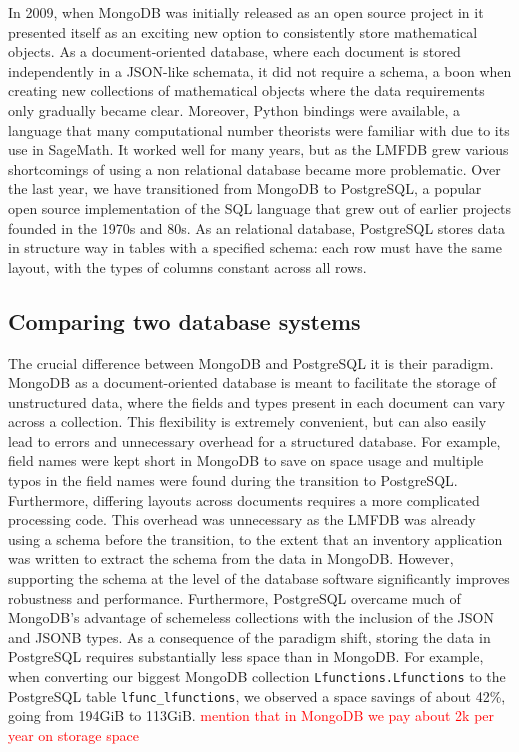 \documentclass{article}
\newcommand{\todo}[1]{\textcolor{red}{#1}}
\begin{document}
In 2009, when MongoDB was initially released as an open source project in it presented itself as an exciting new option to consistently store mathematical objects.
As a document-oriented database, where each document is stored independently in a JSON-like schemata, it did not require a schema, a boon when creating new collections of mathematical objects where the data requirements only gradually became clear.
Moreover, Python bindings were available, a language that many computational number theorists were familiar with due to its use in SageMath.
It worked well for many years, but as the LMFDB grew various shortcomings of using a non relational database became more problematic.
Over the last year, we have transitioned from MongoDB to PostgreSQL, a popular open source implementation of the SQL language that grew out of earlier projects founded in the 1970s and 80s.
As an relational database, PostgreSQL stores data in structure way in tables with a specified schema: each row must have the same layout, with the types of columns constant across all rows.

\subsection{Comparing two database systems}

The crucial difference between MongoDB and PostgreSQL it is their paradigm.
MongoDB as a document-oriented database is meant to facilitate the storage of unstructured data, where the fields and types present in each document can vary across a collection.
This flexibility is extremely convenient, but can also easily lead to errors and unnecessary overhead for a structured database.
For example, field names were kept short in MongoDB to save on space usage and multiple typos in the field names were found during the transition to PostgreSQL.
Furthermore, differing layouts across documents requires a more complicated processing code.
This overhead was unnecessary as the LMFDB was already using a schema before the transition, to the extent that an inventory application was written to extract the schema from the data in MongoDB.
However, supporting the schema at the level of the database software significantly improves robustness and performance.
Furthermore, PostgreSQL overcame much of MongoDB's advantage of schemeless collections with the inclusion of the JSON and JSONB types.
As a consequence of the paradigm shift, storing the data in PostgreSQL requires substantially less space than in MongoDB.
For example, when converting our biggest MongoDB collection \texttt{Lfunctions.Lfunctions} to the PostgreSQL table \texttt{lfunc\_lfunctions}, we observed a space savings of about 42\%, going from 194GiB to 113GiB.
\todo{mention that in MongoDB we pay about 2k per year on storage space}
\end{document}
